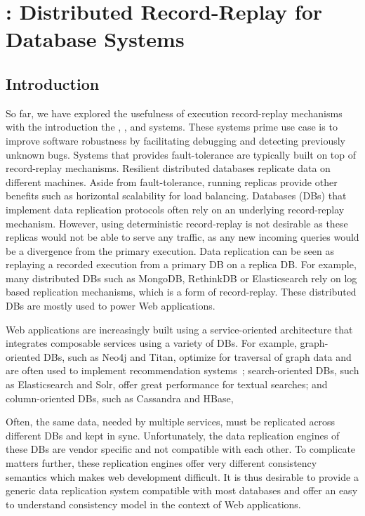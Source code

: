 \chapter{\synapse: Distributed Record-Replay for Database Systems}
\label{ch:synapse}

\section{Introduction}
\label{synapse:sec:intro}

So far, we have explored the usefulness of execution record-replay mechanisms
with the introduction the \scribe, \racepro, and \dora
systems. These systems prime use case is to improve software robustness by
facilitating debugging and detecting previously unknown bugs.
Systems that provides fault-tolerance are typically built on top of
record-replay mechanisms.
Resilient distributed databases replicate data on
different machines. Aside from fault-tolerance, running replicas provide other
benefits such as horizontal scalability for load balancing. Databases (DBs) that
implement data replication protocols often rely on an underlying record-replay
mechanism.
However, using deterministic record-replay is not desirable as these replicas
would not be able to serve any traffic, as any new incoming queries would be a
divergence from the primary execution.
Data replication can be seen as replaying a recorded execution from
a primary DB on a replica DB.
For example, many distributed DBs such
as MongoDB, RethinkDB or Elasticsearch rely on log based replication mechanisms,
which is a form of record-replay.
These distributed DBs are mostly used to power Web applications.

Web applications are increasingly built using a service-oriented
architecture that integrates composable services using a variety of DBs.
For example, graph-oriented DBs, such as Neo4j and Titan, optimize for
traversal of graph data and are often used to implement recommendation
systems~\cite{db-revolution}; search-oriented DBs, such as
Elasticsearch and Solr, offer great performance for textual searches; and
column-oriented DBs, such as Cassandra and HBase,

Often, the same data, needed by multiple services, must be replicated across
different DBs and kept in sync. Unfortunately, the data replication engines of
these DBs are vendor specific and not compatible with each other. To complicate
matters further, these replication engines offer very different consistency
semantics which makes web development difficult.
It is thus desirable to provide a generic data replication system compatible
with most databases and offer an easy to understand consistency model in the
context of Web applications.

